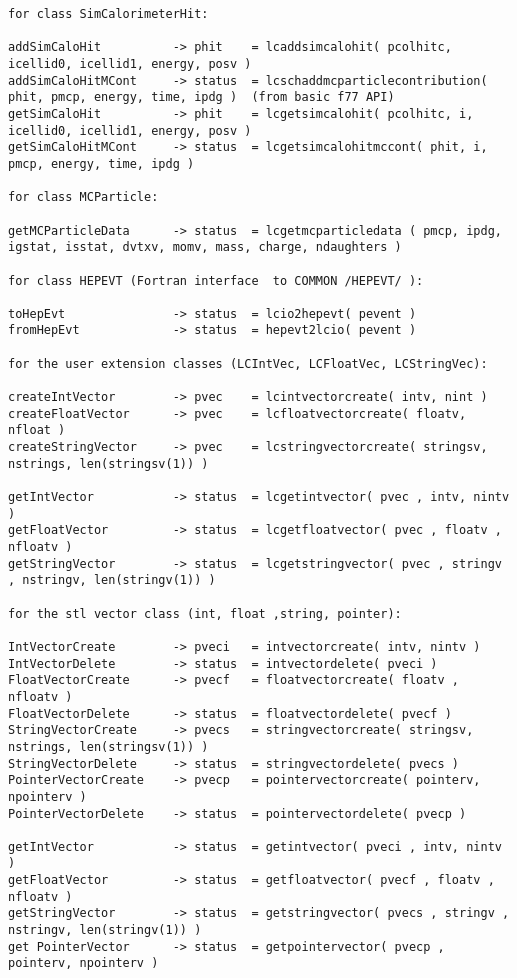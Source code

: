 \begin{scriptsize}
\begin{verbatim}
for class SimCalorimeterHit:

addSimCaloHit          -> phit    = lcaddsimcalohit( pcolhitc, icellid0, icellid1, energy, posv )
addSimCaloHitMCont     -> status  = lcschaddmcparticlecontribution( phit, pmcp, energy, time, ipdg )  (from basic f77 API)
getSimCaloHit          -> phit    = lcgetsimcalohit( pcolhitc, i, icellid0, icellid1, energy, posv )
getSimCaloHitMCont     -> status  = lcgetsimcalohitmccont( phit, i, pmcp, energy, time, ipdg )

for class MCParticle:

getMCParticleData      -> status  = lcgetmcparticledata ( pmcp, ipdg, igstat, isstat, dvtxv, momv, mass, charge, ndaughters )

for class HEPEVT (Fortran interface  to COMMON /HEPEVT/ ):

toHepEvt               -> status  = lcio2hepevt( pevent )
fromHepEvt             -> status  = hepevt2lcio( pevent )

for the user extension classes (LCIntVec, LCFloatVec, LCStringVec):

createIntVector        -> pvec    = lcintvectorcreate( intv, nint )
createFloatVector      -> pvec    = lcfloatvectorcreate( floatv, nfloat )
createStringVector     -> pvec    = lcstringvectorcreate( stringsv, nstrings, len(stringsv(1)) )

getIntVector           -> status  = lcgetintvector( pvec , intv, nintv )
getFloatVector         -> status  = lcgetfloatvector( pvec , floatv , nfloatv )
getStringVector        -> status  = lcgetstringvector( pvec , stringv , nstringv, len(stringv(1)) )

for the stl vector class (int, float ,string, pointer):

IntVectorCreate        -> pveci   = intvectorcreate( intv, nintv )
IntVectorDelete        -> status  = intvectordelete( pveci )
FloatVectorCreate      -> pvecf   = floatvectorcreate( floatv , nfloatv )
FloatVectorDelete      -> status  = floatvectordelete( pvecf )
StringVectorCreate     -> pvecs   = stringvectorcreate( stringsv, nstrings, len(stringsv(1)) )
StringVectorDelete     -> status  = stringvectordelete( pvecs )
PointerVectorCreate    -> pvecp   = pointervectorcreate( pointerv, npointerv )
PointerVectorDelete    -> status  = pointervectordelete( pvecp )

getIntVector           -> status  = getintvector( pveci , intv, nintv )
getFloatVector         -> status  = getfloatvector( pvecf , floatv , nfloatv )
getStringVector        -> status  = getstringvector( pvecs , stringv , nstringv, len(stringv(1)) )
get PointerVector      -> status  = getpointervector( pvecp , pointerv, npointerv )
\end{verbatim}

\end{scriptsize}


